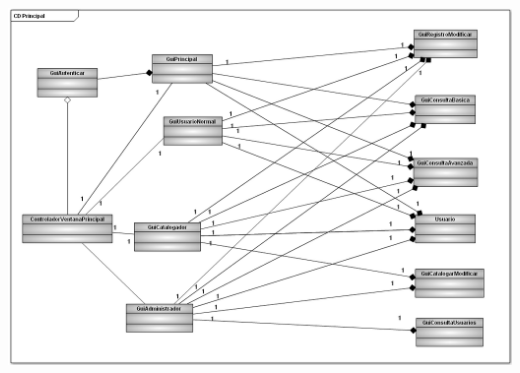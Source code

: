 	\begin{minipage}[c]{1\linewidth}
	\centering
	\includegraphics[width=20cm, height=17cm, angle=90]{diagramasClase/DiagramaClases6}
	\end{minipage}
			
		
	
	

